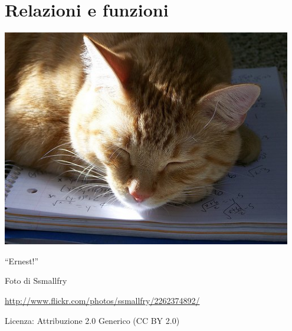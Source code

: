 \part{Relazioni e funzioni}
\includegraphics[width=0.95\textwidth]{img/ernest.jpg}
  \begin{center}
    {\large ``Ernest!''}\par
    Foto di Ssmallfry\par
    \url{http://www.flickr.com/photos/ssmallfry/2262374892/}\par
    Licenza: Attribuzione 2.0 Generico (CC BY 2.0)\par
  \end{center}
\clearpage
\cleardoublepage
